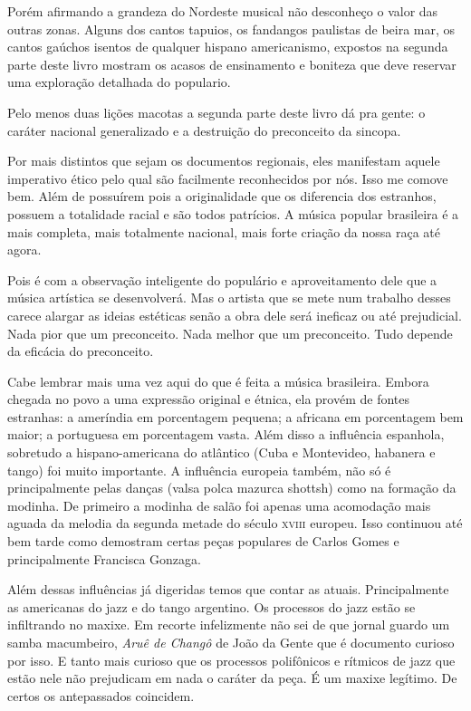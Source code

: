 Porém afirmando a grandeza do Nordeste musical não desconheço o valor
das outras zonas. Alguns dos cantos tapuios, os fandangos paulistas de
beira mar, os cantos gaúchos isentos de qualquer hispano americanismo,
expostos na segunda parte deste livro mostram os acasos de ensinamento e
boniteza que deve reservar uma exploração detalhada do populario.

Pelo menos duas lições macotas a segunda parte deste livro dá pra gente:
o caráter nacional generalizado e a destruição do preconceito da
sincopa.

Por mais distintos que sejam os documentos regionais, eles manifestam
aquele imperativo ético pelo qual são facilmente reconhecidos por nós.
Isso me comove bem. Além de possuírem pois a originalidade que os
diferencia dos estranhos, possuem a totalidade racial e são todos
patrícios. A música popular brasileira é a mais completa, mais
totalmente nacional, mais forte criação da nossa raça até agora.

Pois é com a observação inteligente do populário e aproveitamento dele
que a música artística se desenvolverá. Mas o artista que se mete num
trabalho desses carece alargar as ideias estéticas senão a obra dele
será ineficaz ou até prejudicial. Nada pior que um preconceito. Nada
melhor que um preconceito. Tudo depende da eficácia do preconceito.

Cabe lembrar mais uma vez aqui do que é feita a música brasileira.
Embora chegada no povo a uma expressão original e étnica, ela provém de
fontes estranhas: a ameríndia em porcentagem pequena; a africana em
porcentagem bem maior; a portuguesa em porcentagem vasta. Além disso a
influência espanhola, sobretudo a hispano-americana do atlântico (Cuba e
Montevideo, habanera e tango) foi muito importante. A influência
europeia também, não só é principalmente pelas danças (valsa polca
mazurca shottsh) como na formação da modinha. De primeiro a modinha de
salão foi apenas uma acomodação mais aguada da melodia da segunda metade
do século \textsc{xviii} europeu. Isso continuou até bem tarde como demostram
certas peças populares de Carlos Gomes e principalmente Francisca
Gonzaga.

Além dessas influências já digeridas temos que contar as atuais.
Principalmente as americanas do jazz e do tango argentino. Os processos
do jazz estão se infiltrando no maxixe. Em recorte infelizmente não sei
de que jornal guardo um samba macumbeiro, \textit{Aruê de Changô} de João
da Gente que é documento curioso por isso. E tanto mais curioso que os
processos polifônicos e rítmicos de jazz que estão nele não prejudicam
em nada o caráter da peça. É um maxixe legítimo. De certos os
antepassados coincidem.

